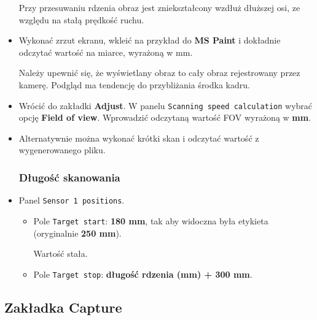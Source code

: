 \documentclass[
  letterpaper,
  DIV=11,
  numbers=noendperiod]{scrreprt}
\begin{document}
\begin{itemize}
  Przy przesuwaniu rdzenia obraz jest zniekształcony wzdłuż dłuższej
  osi, ze względu na stałą prędkość ruchu.
\item
  Wykonać zrzut ekranu, wkleić na przykład do \textbf{MS Paint} i
  dokładnie odczytać wartość na miarce, wyrażoną w mm.

  Należy upewnić się, że wyświetlany obraz to cały obraz rejestrowany
  przez kamerę. Podgląd ma tendencję do przybliżania środka kadru.
\item
  Wrócić do zakładki \textbf{Adjust}. W panelu
  \texttt{Scanning\ speed\ calculation} wybrać opcję \textbf{Field of
  view}. Wprowadzić odczytaną wartość FOV wyrażoną w \textbf{mm}.
\item
  Alternatywnie można wykonać krótki skan i odczytać wartość z
  wygenerowanego pliku.

  \hypertarget{dux142ugoux15bux107-skanowania}{%
  \subsubsection{Długość
  skanowania}\label{dux142ugoux15bux107-skanowania}}
\item
  Panel \texttt{Sensor\ 1\ positions}.

  \begin{itemize}
  \item
    Pole \texttt{Target\ start}: \textbf{180 mm}, tak aby widoczna była
    etykieta (oryginalnie \textbf{250 mm}).

    Wartość stała.
  \item
    Pole \texttt{Target\ stop}: \textbf{długość rdzenia (mm) + 300 mm}.
  \end{itemize}
\end{itemize}

\hypertarget{zakux142adka-capture}{%
\subsection{Zakładka Capture}\label{zakux142adka-capture}}
\end{document}
